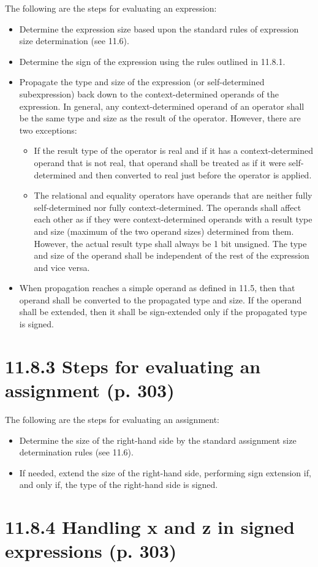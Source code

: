 \documentclass{article}
\begin{document}
  {
    \color{red}

    The following are the steps for evaluating an expression:
    \begin{itemize}
      \item Determine the expression size based upon the standard rules of
        expression size determination (see 11.6).
      \item Determine the sign of the expression using the rules outlined in
        11.8.1.
      \item Propagate the type and size of the expression (or self-determined
        subexpression) back down to the context-determined operands of the
        expression. In general, any context-determined operand of an operator
        shall be the same type and size as the result of the operator.
        However, there are two exceptions:
        \begin{itemize}
          \item If the result type of the operator is real and if it has a
            context-determined operand that is not real, that operand
            shall be treated as if it were self-determined and then
            converted to real just before the operator is applied.
          \item The relational and equality operators have operands that are
            neither fully self-determined nor fully context-determined. The
            operands shall affect each other as if they were context-determined
            operands with a result type and size (maximum of the two operand
            sizes) determined from them. However, the actual result type shall
            always be 1 bit unsigned. The type and size of the operand shall be
            independent of the rest of the expression and vice versa.
        \end{itemize}
      \item When propagation reaches a simple operand as defined in 11.5, then
        that operand shall be converted to the propagated type and size. If the
        operand shall be extended, then it shall be sign-extended only if the
        propagated type is signed.
    \end{itemize}

    \section*{11.8.3 Steps for evaluating an assignment (p. 303)}

    The following are the steps for evaluating an assignment:
    \begin{itemize}
      \item Determine the size of the right-hand side by the standard assignment
        size determination rules (see 11.6).
      \item If needed, extend the size of the right-hand side, performing sign
        extension if, and only if, the type of the right-hand side is signed.
    \end{itemize}
  }

\section*{11.8.4 Handling x and z in signed expressions (p. 303)}

\textelp{}
\end{document}
